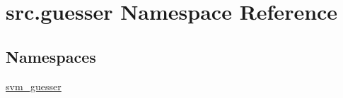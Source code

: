 \hypertarget{namespacesrc_1_1guesser}{}\section{src.\+guesser Namespace Reference}
\label{namespacesrc_1_1guesser}
\subsection*{Namespaces}
\begin{DoxyCompactItemize}
\item 
 \hyperlink{namespacesrc_1_1guesser_1_1svm__guesser}{svm\+\_\+guesser}
\end{DoxyCompactItemize}

